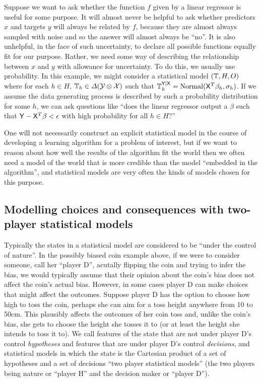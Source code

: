 Suppose we want to ask whether the function $f$ given by a linear regressor is useful for some purpose. It will almost never be helpful to ask whether predictors $x$ and targets $y$ will always be related by $f$, because they are almost always sampled with noise and so the answer will almost always be ``no''. It is also unhelpful, in the face of such uncertainty, to declare all possible functions equally fit for our purpose. Rather, we need some way of describing the relationship between $x$ and $y$ with allowance for uncertainty. To do this, we usually use probability. In this example, we might consider a statistical model $(\mathbb{T},H,O)$ where for each $h\in H$, $\mathbb{T}_h\in \Delta(\mathcal{Y}\otimes\mathcal{X})$ such that $\mathbb{T}_h^{\mathsf{Y}|\mathsf{X}}=\text{Normal}(\mathsf{X}^T\beta_h,\sigma_h)$. If we assume the data generating process is described by such a probability distribution for some $h$, we can ask questions like ``does the linear regressor output a $\beta$ such that $\mathsf{Y}-\mathsf{X}^T\beta<\epsilon$ with high probability for all $h\in H$?''

One will not necessarily construct an explicit statistical model in the course of developing a learning algorithm for a problem of interest, but if we want to reason about how well the results of the algorithm fit the world then we often need a model of the world that is more credible than the model ``embedded in the algorithm'', and statistical models are very often the kinds of models chosen for this purpose.

\subsection{Modelling choices and consequences with two-player statistical models}

Typically the states in a statistical model are considered to be ``under the control of nature''. In the possibly biased coin example above, if we were to consider someone, call her ``player D'', acutally flipping the coin and trying to infer the bias, we would typically assume that their opinion about the coin's bias does not affect the coin's actual bias. However, in some cases player D can make choices that might affect the outcomes. Suppose player D has the option to choose how high to toss the coin, perhaps she can aim for a toss height anywhere from 10 to 50cm. This plausibly affects the outcomes of her coin toss and, unlike the coin's bias, she gets to choose the height she tosses it to (or at least the height she intends to toss it to). We call features of the state that are not under player D's control \emph{hypotheses} and features that are under player D's control \emph{decisions}, and statistical models in which the state is the Cartesian product of a set of hypotheses and a set of decisions ``two player statistical models'' (the two players being nature or ``player H'' and the decision maker or ``player D'').

